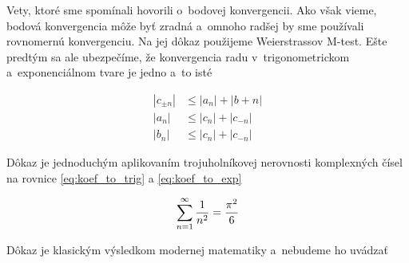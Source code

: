 
Vety, ktoré sme spomínali hovorili o~bodovej konvergencii. Ako však
vieme, bodová konvergencia môže byť zradná a~omnoho radšej by
sme používali rovnomernú konvergenciu. Na jej dôkaz použijeme
Weierstrassov M-test. Ešte predtým sa ale ubezpečíme, že
konvergencia radu v~trigonometrickom a~exponenciálnom tvare je jedno 
a~to isté
\begin{lema}
   \begin{align*}
    |c_{\pm n}| &\le |a_n| + |b+n| \\
    |a_n| &\le |c_n| + |c_{-n}| \\
    |b_n| &\le |c_n| + |c_{-n}|
   \end{align*}
   \label{lema:konv_mtest_tring_exp_equiv}
\end{lema}
\begin{dokaz}
    Dôkaz je jednoduchým aplikovaním trojuholníkovej nerovnosti
    komplexných čísel na rovnice \eqref{eq:koef_to_trig}
    a \eqref{eq:koef_to_exp}
\end{dokaz}

\begin{lema}
    \begin{equation*}
        \sum_{n=1}^{\infty} \frac{1}{n^2} = \frac{\pi^2}{6}
    \end{equation*}
    \label{lema:sum_nn}
\end{lema}
\begin{dokaz}
    Dôkaz je klasickým výsledkom modernej matematiky a~nebudeme ho
    uvádzať
\end{dokaz}

